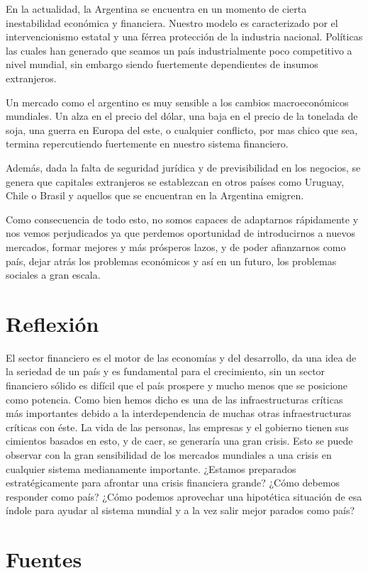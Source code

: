 \documentclass{article}
\begin{document}
En la actualidad, la Argentina se encuentra en un momento de cierta inestabilidad económica y financiera. Nuestro modelo es caracterizado por el intervencionismo estatal y una férrea protección de la industria nacional. Políticas las cuales han generado que seamos un país industrialmente poco competitivo a nivel mundial, sin embargo siendo fuertemente dependientes de insumos extranjeros. 

Un mercado como el argentino es muy sensible a los cambios macroeconómicos mundiales. Un alza en el precio del dólar, una baja en el precio de la tonelada de soja, una guerra en Europa del este, o cualquier conflicto, por mas chico que sea, termina repercutiendo fuertemente en nuestro sistema financiero. 

Además, dada la falta de seguridad jurídica y de previsibilidad en los negocios, se genera que capitales extranjeros se establezcan en otros países como Uruguay, Chile o Brasil y aquellos que se encuentran en la Argentina emigren.

Como consecuencia de todo esto, no somos capaces de adaptarnos rápidamente y nos vemos perjudicados ya que perdemos oportunidad de introducirnos a nuevos mercados, formar mejores y más prósperos lazos, y de poder afianzarnos como país, dejar atrás los problemas económicos y así en un futuro, los problemas sociales a gran escala. 


\section{Reflexión}
El sector financiero es el motor de las economías y del desarrollo, da una idea de la seriedad de un país y es fundamental para el crecimiento, sin un sector financiero sólido es difícil que el país prospere y mucho menos que se posicione como potencia. Como bien hemos dicho es una de las infraestructuras críticas más importantes debido a la interdependencia de muchas otras infraestructuras críticas con éste. La vida de las personas, las empresas y el gobierno tienen sus cimientos basados en esto, y de caer, se generaría una gran crisis. Esto se puede observar con la gran sensibilidad de los mercados mundiales a una crisis en cualquier sistema medianamente importante. ¿Estamos preparados estratégicamente para afrontar una crisis financiera grande? ¿Cómo debemos responder como país? ¿Cómo podemos aprovechar una hipotética situación de esa índole para ayudar al sistema mundial y a la vez salir mejor parados como país?

\section{Fuentes}
\end{document}

